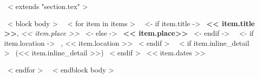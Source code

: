 ~< extends "section.tex" >~

~< block body >~
    ~< for item in items >~
      ~<- if item.title ->~
      \textbf{<< item.title >>}, \emph{<< item.place >>}
      ~<- else ->~
      \textbf{<< item.place>>}
      ~<- endif ->~
      ~<- if item.location ->~
      , << item.location >>
      ~< endif >~
      ~< if item.inline_detail >~
        (<< item.inline_detail >>)
      ~< endif >~
      \hfill << item.dates >> \par
    ~< endfor >~
~< endblock body >~
